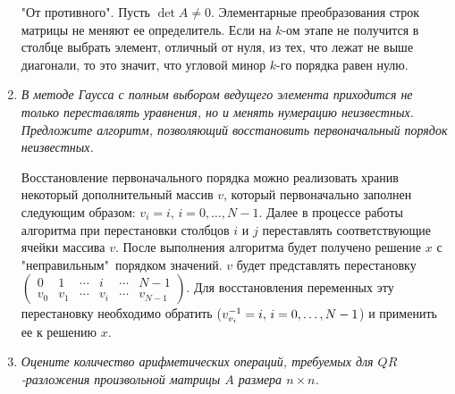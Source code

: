 \documentclass[12pt, a4paper]{article}
\begin{document}
\begin{enumerate}
		\smallskip
		"От противного". Пусть $\det A \ne 0$. Элементарные преобразования строк матрицы не меняют ее определитель. Если на $k$-ом этапе не получится в столбце выбрать элемент, отличный от нуля, из тех, что лежат не выше диагонали, то это значит, что угловой минор $k$-го порядка равен нулю. 
		\smallskip
		
		\item \textit{В методе Гаусса с полным выбором ведущего элемента
			приходится не только переставлять уравнения, но и менять нумерацию неизвестных. Предложите алгоритм, позволяющий восстановить первоначальный порядок неизвестных.}
		
		\smallskip
		Восстановление первоначального порядка можно реализовать хранив некоторый дополнительный массив $v$, который первоначально заполнен следующим образом: $v_i = i,\, i=0,\dots, N-1$. Далее в процессе работы алгоритма при перестановки столбцов $i$ и $j$ переставлять соответствующие ячейки массива $v$. После выполнения алгоритма будет получено решение $x$ с "неправильным"\, порядком значений. $v$ будет представлять перестановку $\begin{pmatrix}
			0 & 1 & \cdots & i & \cdots & N-1 \\
			v_0 & v_1 & \cdots & v_i & \cdots & v_{N-1}
		\end{pmatrix}$. Для восстановления переменных эту перестановку необходимо обратить ($v^{-1}_{v_i} \brop= i,\, i=0,\dots, N-1$) и применить ее к решению $x$.
		\smallskip
		
		\item \textit{Оцените количество арифметических операций, требуемых для $QR$-разложения произвольной матрицы $A$ размера $n\times n$.}
	

\end{enumerate}
\end{document}
